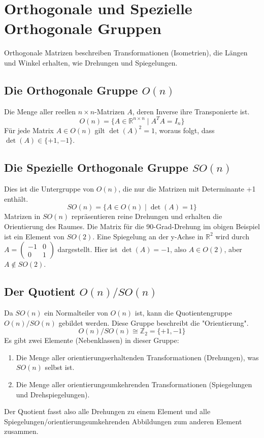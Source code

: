 \section{Orthogonale und Spezielle Orthogonale Gruppen}
Orthogonale Matrizen beschreiben Transformationen (Isometrien), die Längen und Winkel erhalten, wie Drehungen und Spiegelungen.

\subsection{Die Orthogonale Gruppe \(O(n)\)}
Die Menge aller reellen \(n \times n\)-Matrizen \(A\), deren Inverse ihre Transponierte ist.
\[
    O(n) = \{A \in \mathbb{R}^{n \times n} \mid A^T A = I_n\}
\]
Für jede Matrix \(A \in O(n)\) gilt \(\det(A)^2 = 1\), woraus folgt, dass \(\det(A) \in \{+1, -1\}\).

\subsection{Die Spezielle Orthogonale Gruppe \(SO(n)\)}
Dies ist die Untergruppe von \(O(n)\), die nur die Matrizen mit Determinante +1 enthält.
\[
    SO(n) = \{A \in O(n) \mid \det(A) = 1\}
\]
Matrizen in $SO(n)$ repräsentieren reine Drehungen und erhalten die Orientierung des Raumes. Die Matrix für die 90-Grad-Drehung im obigen Beispiel ist ein Element von $SO(2)$. Eine Spiegelung an der y-Achse in \(\mathbb{R}^2\) wird durch \(A = \begin{pmatrix} -1 & 0 \\ 0 & 1 \end{pmatrix}\) dargestellt. Hier ist \(\det(A) = -1\), also \(A \in O(2)\), aber \(A \notin SO(2)\).

\subsection{Der Quotient \(O(n)/SO(n)\)}
Da \(SO(n)\) ein Normalteiler von \(O(n)\) ist, kann die Quotientengruppe \(O(n)/SO(n)\) gebildet werden. Diese Gruppe beschreibt die "Orientierung".
\[
    O(n)/SO(n) \cong \mathbb{Z}_2 = \{+1, -1\}
\]
Es gibt zwei Elemente (Nebenklassen) in dieser Gruppe:
\begin{enumerate}
    \item Die Menge aller orientierungserhaltenden Transformationen (Drehungen), was \(SO(n)\) selbst ist.
    \item Die Menge aller orientierungsumkehrenden Transformationen (Spiegelungen und Drehspiegelungen).
\end{enumerate}
Der Quotient fasst also alle Drehungen zu einem Element und alle Spiegelungen/orientierungsumkehrenden Abbildungen zum anderen Element zusammen.
